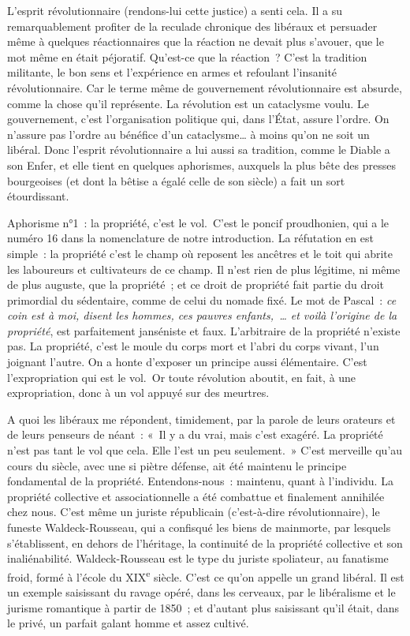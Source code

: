 \documentclass[french,twoside]{book} %
\begin{document}
L’esprit révolutionnaire (rendons-lui cette justice) a senti cela. Il a su remarquablement profiter de la reculade chronique des libéraux et persuader même à quelques réactionnaires que la réaction ne devait plus s’avouer, que le mot même en était péjoratif. Qu’est-ce que la réaction ? C’est la tradition militante, le bon sens et l’expérience en armes et refoulant l’insanité révolutionnaire. Car le terme même de gouvernement révolutionnaire est absurde, comme la chose qu’il représente. La révolution est un cataclysme voulu. Le gouvernement, c’est l’organisation politique qui, dans l’État, assure l’ordre. On n’assure pas l’ordre au bénéfice d’un cataclysme… à moins qu’on ne soit un libéral. Donc l’esprit révolutionnaire a lui aussi sa tradition, comme le Diable a son Enfer, et elle tient en quelques aphorismes, auxquels la plus bête des presses bourgeoises (et dont la bêtise a égalé celle de son siècle) a fait un sort étourdissant.\par
Aphorisme n°1 : la propriété, c’est le vol. C’est le poncif proudhonien, qui a le numéro 16 dans la nomenclature de notre introduction. La réfutation en est simple : la propriété c’est le champ où reposent les ancêtres et le toit qui abrite les laboureurs et cultivateurs de ce champ. Il n’est rien de plus légitime, ni même de plus auguste, que la propriété ; et ce droit de propriété fait partie du droit primordial du sédentaire, comme de celui du nomade fixé. Le mot de Pascal : {\itshape ce coin est à moi, disent les hommes, ces pauvres enfants, … et voilà l’origine de la propriété}, est parfaitement janséniste et faux. L’arbitraire de la propriété n’existe pas. La propriété, c’est le moule du corps mort et l’abri du corps vivant, l’un joignant l’autre. On a honte d’exposer un principe aussi élémentaire. C’est l’expropriation qui est le vol. Or toute révolution aboutit, en fait, à une expropriation, donc à un vol appuyé sur des meurtres.\par
A quoi les libéraux me répondent, timidement, par la parole de leurs orateurs et de leurs penseurs de néant : « Il y a du vrai, mais c’est exagéré. La propriété n’est pas tant le vol que cela. Elle l’est un peu seulement. » C’est merveille qu’au cours du siècle, avec une si piètre défense, ait été maintenu le principe fondamental de la propriété. Entendons-nous : maintenu, quant à l’individu. La propriété collective et associationnelle a été combattue et finalement annihilée chez nous. C’est même un juriste républicain (c’est-à-dire révolutionnaire), le funeste Waldeck-Rousseau, qui a confisqué les biens de mainmorte, par lesquels s’établissent, en dehors de l’héritage, la continuité de la propriété collective et son inaliénabilité. Waldeck-Rousseau est le type du juriste spoliateur, au fanatisme froid, formé à l’école du XIX\textsuperscript{e} siècle. C’est ce qu’on appelle un grand libéral. Il est un exemple saisissant du ravage opéré, dans les cerveaux, par le libéralisme et le jurisme romantique à partir de 1850 ; et d’autant plus saisissant qu’il était, dans le privé, un parfait galant homme et assez cultivé.\par
\end{document}
